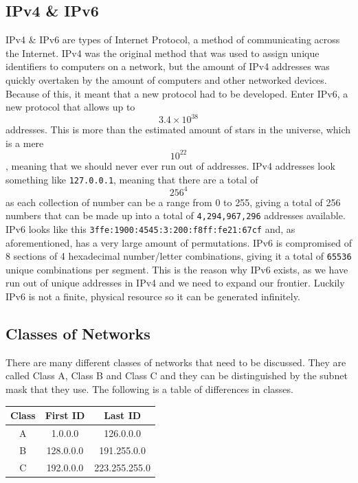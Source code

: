 \documentclass[a4paper,12pt]{article}
\begin{document}
  \subsection{IPv4 \& IPv6}
    IPv4 \& IPv6 are types of Internet Protocol, a method of communicating across the Internet. IPv4 was the original method that was used to assign unique identifiers to computers on a network, but the amount of IPv4 addresses was quickly overtaken by the amount of computers and other networked devices. Because of this, it meant that a new protocol had to be developed. Enter IPv6, a new protocol that allows up to $${3.4 \times 10^38}$$ addresses. This is more than the estimated amount of stars in the universe, which is a mere $${10^22}$$, meaning that we should never ever run out of addresses. IPv4 addresses look something like \texttt{127.0.0.1}, meaning that there are a total of $${256^4}$$ as each collection of number can be a range from 0 to 255, giving a total of 256 numbers that can be made up into a total of \texttt{4,294,967,296} addresses available. IPv6 looks like this \texttt{3ffe:1900:4545:3:200:f8ff:fe21:67cf} and, as aforementioned, has a very large amount of permutations. IPv6 is compromised of 8 sections of 4 hexadecimal number/letter combinations, giving it a total of \texttt{65536} unique combinations per segment. This is the reason why IPv6 exists, as we have run out of unique addresses in IPv4 and we need to expand our frontier. Luckily IPv6 is not a finite, physical resource so it can be generated infinitely.

  \subsection{Classes of Networks}
    There are many different classes of networks that need to be discussed. They are called Class A, Class B and Class C and they can be distinguished by the subnet mask that they use. The following is a table of differences in classes.

    \begin{center}
	\begin{tabular}{|c|c|c|}
	    \hline
	    Class & First ID & Last ID\\ \hline
	    A & 1.0.0.0 & 126.0.0.0\\ \hline
	    B & 128.0.0.0 & 191.255.0.0\\ \hline
	    C & 192.0.0.0 & 223.255.255.0\\ \hline
	    \hline
	\end{tabular}
    \end{center}
\end{document}
